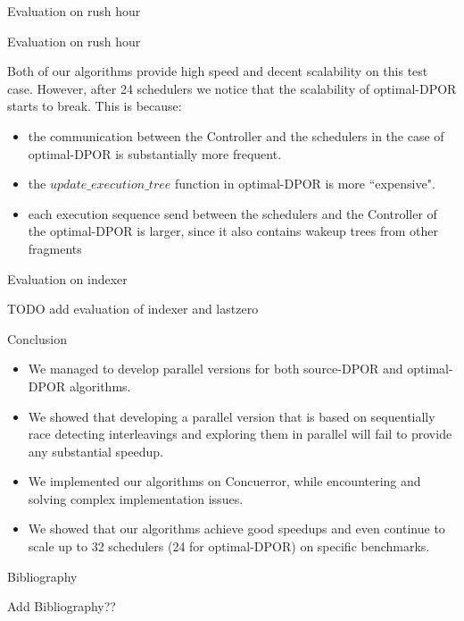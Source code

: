 \begin{frame}{Evaluation on rush hour}



\end{frame}


\begin{frame}{Evaluation on rush hour}

Both of our algorithms provide high speed and decent scalability on this test case.
However, after 24 schedulers we notice that the scalability of optimal-DPOR starts to break. This is because:

\begin{itemize}
\item the communication between the Controller and the schedulers in the case of optimal-DPOR is substantially more frequent.
\item the $update\_execution\_tree$ function in optimal-DPOR is more ``expensive". 
\item each execution sequence send between the schedulers and the Controller of the optimal-DPOR is larger, since it also contains wakeup trees from other fragments
\end{itemize}

\end{frame}

\begin{frame}{Evaluation on indexer}

TODO add evaluation of indexer and lastzero

\end{frame}

\begin{frame}{Conclusion}

\begin{itemize}
\item We managed to develop parallel versions for both source-DPOR and optimal-DPOR algorithms.
\item We showed that developing a parallel version that is based on sequentially race detecting interleavings and exploring them in parallel will fail to provide any substantial speedup.
\item We implemented our algorithms on Concuerror, while encountering and solving complex implementation issues.
\item We showed that our algorithms achieve good speedups and even continue to scale up to 32 schedulers (24 for optimal-DPOR) on specific benchmarks.
\end{itemize}

\end{frame}


\begin{frame}{Bibliography}

Add Bibliography??

\end{frame}


\begin{frame}{}



\end{frame}

 
